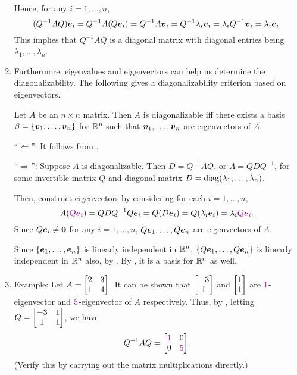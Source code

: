 \begin{enumerate}
\begin{pf}
Hence, for any \(i=1,\dotsc,n\),
\[
(Q^{-1}AQ)\vb*{e}_i=Q^{-1}A(Q\vb*{e}_i)
=Q^{-1}A\vb*{v}_i
=Q^{-1}\lambda_i\vb*{v}_i
=\lambda_iQ^{-1}\vb*{v}_i
=\lambda_i\vb*{e}_i.
\]
This implies that \(Q^{-1}AQ\) is a diagonal matrix with diagonal entries
being \(\lambda_1,\dotsc,\lambda_n\).
\end{pf}

\item Furthermore, eigenvalues and eigenvectors can help us determine the
diagonalizability. The following gives a diagonalizability criterion based on
eigenvectors.

\begin{theorem}
\label{thm:diag-crit}
Let \(A\) be an \(n\times n\) matrix. Then \(A\) is diagonalizable iff there
exists a basis \(\beta=\{\vb*{v}_1,\dotsc,\vb*{v}_n\}\) for \(\mathbb{R}^n\) such that
\(\vb*{v}_1,\dotsc,\vb*{v}_n\) are eigenvectors of \(A\).
\end{theorem}
\begin{pf}
``\(\Leftarrow\)'': It follows from .

``\(\Rightarrow\)'': Suppose \(A\) is diagonalizable. Then \(D=Q^{-1}AQ\), or
\(A=QDQ^{-1}\), for some invertible matrix \(Q\) and diagonal matrix
\(D=\operatorname{diag}(\lambda_1,\dotsc,\lambda_n)\).

Then, construct eigenvectors by considering for each \(i=1,\dotsc,n\),
\[
A({\color{violet}Q\vb*{e}_i})=QDQ^{-1}Q\vb*{e}_i=Q(D\vb*{e}_i)=Q(\lambda_i\vb*{e}_i)=\lambda_i{\color{violet}Q\vb*{e}_i}.
\]
Since \(Q\vb*{e}_i\ne\vb*{0}\) for any \(i=1,\dotsc,n\),
\(Q\vb*{e}_1,\dotsc,Q\vb*{e}_n\) are eigenvectors of \(A\).

Since \(\{\vb*{e}_1,\dotsc,\vb*{e}_n\}\) is linearly independent in \(\mathbb{R}^n\),
\(\{Q\vb*{e}_1,\dotsc,Q\vb*{e}_n\}\) is linearly independent in \(\mathbb{R}^n\)
also, by . By ,
it is a basis for \(\mathbb{R}^n\) as well.
\end{pf}

\item Example: Let \(A=\mqty[2&3\\ 1&4]\). It can be shown that \(\mqty[-3\\
1]\) and \(\mqty[1\\ 1]\) are \({\color{magenta}1}\)-eigenvector and
\({\color{violet}5}\)-eigenvector of \(A\) respectively. Thus, by ,
letting \(Q=\mqty[-3&1\\ 1&1]\), we have
\[
Q^{-1}AQ=\mqty[\mgc{1}&0\\ 0&\vc{5}].
\]
(Verify this by carrying out the matrix multiplications directly.)


\end{enumerate}
